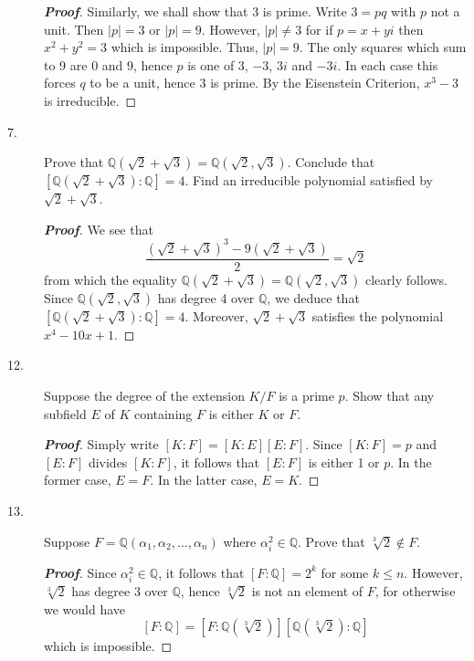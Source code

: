 \documentclass[12pt,leqno]{book}
\theoremstyle{definition}
\newcommand{\Q}{\mathbb{Q}}
\newenvironment{Proof}{\begin{proof}[\textnormal{\textbf{Proof}}]}{\end{proof}}
\begin{document}
\begin{description}
\begin{Proof}
Similarly, we shall show that 3 is prime. Write $3=pq$ with $p$ not a unit. Then $|p|=3$ or $|p|=9$. However, $|p|\not=3$ for if $p=x+yi$ then $x^2+y^2=3$ which is impossible. Thus, $|p|=9$. The only squares which sum to 9 are 0 and 9, hence $p$ is one of 3, $-3$, $3i$ and $-3i$. In each case this forces $q$ to be a unit, hence 3 is prime. By the Eisenstein Criterion, $x^3-3$ is irreducible.
  \end{Proof}
 \item [7.] Prove that $\Q(\sqrt{2}+\sqrt{3})=\Q(\sqrt{2},\sqrt{3})$. Conclude that $[\Q(\sqrt{2}+\sqrt{3}):\Q]=4$. Find an irreducible polynomial satisfied by $\sqrt{2}+\sqrt{3}$.
  \begin{Proof}
   We see that \[\frac{(\sqrt{2}+\sqrt{3})^3-9(\sqrt{2}+\sqrt{3})}{2}=\sqrt{2}\] from which the equality $\Q(\sqrt{2}+\sqrt{3})=\Q(\sqrt{2},\sqrt{3})$ clearly follows. Since $\Q(\sqrt{2},\sqrt{3})$ has degree 4 over $\Q$, we deduce that $[\Q(\sqrt{2}+\sqrt{3}):\Q]=4$. Moreover, $\sqrt{2}+\sqrt{3}$ satisfies the polynomial $x^4-10x+1$.
  \end{Proof}
 \item [12.] Suppose the degree of the extension $K/F$ is a prime $p$. Show that any subfield $E$ of $K$ containing $F$ is either $K$ or $F$.
  \begin{Proof}
   Simply write $[K:F]=[K:E][E:F]$. Since $[K:F]=p$ and $[E:F]$ divides $[K:F]$, it follows that $[E:F]$ is either 1 or $p$. In the former case, $E=F$. In the latter case, $E=K$.
  \end{Proof}
 \item [13.] Suppose $F=\Q(\alpha_1,\alpha_2,\hdots,\alpha_n)$ where $\alpha_i^2\in\Q$. Prove that $\sqrt[3]{2}\not\in F$. 
  \begin{Proof}
   Since $\alpha_i^2\in\Q$, it follows that $[F:\Q]=2^k$ for some $k\leq n$. However, $\sqrt[3]{2}$ has degree 3 over $\Q$, hence $\sqrt[3]{2}$ is not an element of $F$, for otherwise we would have \[[F:\Q]=[F:\Q(\sqrt[3]{2})][\Q(\sqrt[3]{2}):\Q]\] which is impossible.
  \end{Proof}

\end{description}
\end{document}
